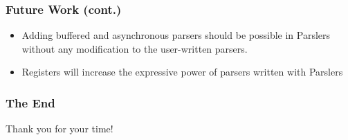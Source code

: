\documentclass{slides}
\begin{document}
\begin{frame}
\frametitle{Future Work (cont.)}

\begin{itemize}
    \item Adding buffered and asynchronous parsers should be possible in Parslers without any modification to the user-written parsers.
    \item Registers will increase the expressive power of parsers written with Parslers
\end{itemize} 

\end{frame}

\begin{frame}
\frametitle{The End}
\begin{center}
\Large
    Thank you for your time!
\end{center}
\end{frame}
\end{document}
